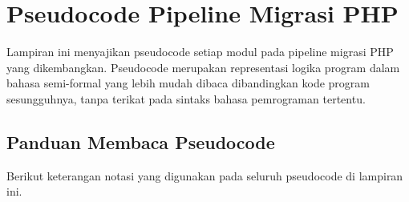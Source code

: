 {}
\section*{Pseudocode Pipeline Migrasi PHP}
\label{app:pseudocode-pipeline}


Lampiran ini menyajikan pseudocode setiap modul pada pipeline migrasi PHP yang
dikembangkan. Pseudocode merupakan representasi logika program dalam bahasa
semi-formal yang lebih mudah dibaca dibandingkan kode program sesungguhnya,
tanpa terikat pada sintaks bahasa pemrograman tertentu.

\subsection*{Panduan Membaca Pseudocode}

Berikut keterangan notasi yang digunakan pada seluruh pseudocode di lampiran ini.

